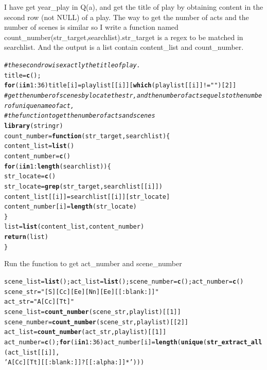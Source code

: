 \documentclass{article}\usepackage[]{graphicx}\usepackage[]{color}
\makeatletter
\newcommand{\hlnum}[1]{\textcolor[rgb]{0.686,0.059,0.569}{#1}}%
\newcommand{\hlstr}[1]{\textcolor[rgb]{0.192,0.494,0.8}{#1}}%
\newcommand{\hlcom}[1]{\textcolor[rgb]{0.678,0.584,0.686}{\textit{#1}}}%
\newcommand{\hlopt}[1]{\textcolor[rgb]{0,0,0}{#1}}%
\newcommand{\hlstd}[1]{\textcolor[rgb]{0.345,0.345,0.345}{#1}}%
\newcommand{\hlkwa}[1]{\textcolor[rgb]{0.161,0.373,0.58}{\textbf{#1}}}%
\newcommand{\hlkwb}[1]{\textcolor[rgb]{0.69,0.353,0.396}{#1}}%
\newcommand{\hlkwc}[1]{\textcolor[rgb]{0.333,0.667,0.333}{#1}}%
\newcommand{\hlkwd}[1]{\textcolor[rgb]{0.737,0.353,0.396}{\textbf{#1}}}%
\newenvironment{kframe}{%
 \def\at@end@of@kframe{}%
 \ifinner\ifhmode%
  \def\at@end@of@kframe{\end{minipage}}%
  \begin{minipage}{\columnwidth}%
 \fi\fi%
 \def\FrameCommand##1{\hskip\@totalleftmargin \hskip-\fboxsep
 \colorbox{shadecolor}{##1}\hskip-\fboxsep
     \hskip-\linewidth \hskip-\@totalleftmargin \hskip\columnwidth}%
 \MakeFramed {\advance\hsize-\width
   \@totalleftmargin\z@ \linewidth\hsize
   \@setminipage}}%
 {\par\unskip\endMakeFramed%
 \at@end@of@kframe}
\newenvironment{knitrout}{}{} %
\makeatother
\begin{document}
I have get year\_play in Q(a), and get the title of play by obtaining content in the second row (not NULL) of a play.
The way to get the number of acts and the number of scenes is similar so I write a function named count\_number(str\_target,searchlist).str\_target is a regex to be matched in searchlist. And the output is a list contain content\_list and count\_number.
\begin{knitrout}
\color{fgcolor}\begin{kframe}
\begin{alltt}
\hlcom{#the second row is exactly the title of play.}
\hlstd{title}\hlkwb{=}\hlkwd{c}\hlstd{();}
\hlkwa{for}\hlstd{(i} \hlkwa{in} \hlnum{1}\hlopt{:}\hlnum{36}\hlstd{) title[i]}\hlkwb{=}\hlstd{playlist[[i]][}\hlkwd{which}\hlstd{(playlist[[i]]}\hlopt{!=}\hlstr{""}\hlstd{)[}\hlnum{2}\hlstd{]]}
\hlcom{#get the number of scenes by locate the str , and the number of acts equels to the number of unique name of act ,}
\hlcom{#the function to get the number of acts and scenes}
\hlkwd{library}\hlstd{(stringr)}
\hlstd{count_number}\hlkwb{=}\hlkwa{function}\hlstd{(}\hlkwc{str_target}\hlstd{,}\hlkwc{searchlist}\hlstd{)\{}
  \hlstd{content_list}\hlkwb{=}\hlkwd{list}\hlstd{()}
  \hlstd{content_number}\hlkwb{=}\hlkwd{c}\hlstd{()}
  \hlkwa{for}\hlstd{(i} \hlkwa{in} \hlnum{1}\hlopt{:}\hlkwd{length}\hlstd{(searchlist))\{}
    \hlstd{str_locate}\hlkwb{=}\hlkwd{c}\hlstd{()}
    \hlstd{str_locate}\hlkwb{=}\hlkwd{grep}\hlstd{(str_target,searchlist[[i]])}
    \hlstd{content_list[[i]]}\hlkwb{=}\hlstd{searchlist[[i]][str_locate]}
    \hlstd{content_number[i]}\hlkwb{=}\hlkwd{length}\hlstd{(str_locate)}
  \hlstd{\}}
  \hlstd{list}\hlkwb{=}\hlkwd{list}\hlstd{(content_list,content_number)}
  \hlkwd{return}\hlstd{(list)}
\hlstd{\}}
\end{alltt}
\end{kframe}
\end{knitrout}
Run the function to get  act\_number and scene\_number
\begin{knitrout}
\color{fgcolor}\begin{kframe}
\begin{alltt}
\hlstd{scene_list}\hlkwb{=}\hlkwd{list}\hlstd{();act_list}\hlkwb{=}\hlkwd{list}\hlstd{();scene_number}\hlkwb{=}\hlkwd{c}\hlstd{();act_number}\hlkwb{=}\hlkwd{c}\hlstd{()}
\hlstd{scene_str}\hlkwb{=}\hlstr{"[S][Cc][Ee][Nn][Ee][[:blank:]]"}
\hlstd{act_str}\hlkwb{=}\hlstr{"A[Cc][Tt] "}
\hlstd{scene_list}\hlkwb{=}\hlkwd{count_number}\hlstd{(scene_str,playlist)[[}\hlnum{1}\hlstd{]]}
\hlstd{scene_number}\hlkwb{=}\hlkwd{count_number}\hlstd{(scene_str,playlist)[[}\hlnum{2}\hlstd{]]}
\hlstd{act_list}\hlkwb{=}\hlkwd{count_number}\hlstd{(act_str,playlist)[[}\hlnum{1}\hlstd{]]}
\hlstd{act_number}\hlkwb{=}\hlkwd{c}\hlstd{();}\hlkwa{for}\hlstd{(i} \hlkwa{in} \hlnum{1}\hlopt{:} \hlnum{36}\hlstd{) act_number[i]}\hlkwb{=}\hlkwd{length}\hlstd{(}\hlkwd{unique}\hlstd{(}\hlkwd{str_extract_all}\hlstd{(act_list[[i]],}
\hlstr{'A[Cc][Tt][[:blank:]]?[[:alpha:]]*'}\hlstd{)))}
\end{alltt}
\end{kframe}
\end{knitrout}
\end{document}
